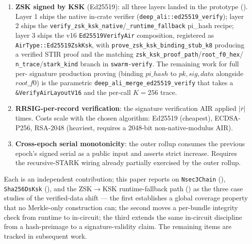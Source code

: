 \documentclass[11pt,a4paper]{article}
\theoremstyle{definition}
\theoremstyle{plain}
\begin{document}
\begin{enumerate}[leftmargin=*]
  \item \textbf{ZSK signed by KSK} (Ed25519): all three layers
        landed in the prototype ().
        Layer 1 ships the native in-crate verifier
        (\texttt{deep\_ali::ed25519\_verify}); layer 2 ships the
        \texttt{verify\_zsk\_ksk\_native}/\texttt{\_runtime\_fallback}
        pi_hash recipe; layer 3 ships the v16
        \texttt{Ed25519VerifyAir} composition, registered as
        \texttt{AirType::Ed25519ZskKsk}, with
        \texttt{prove\_zsk\_ksk\_binding\_stub\_k8} producing a
        verified STIR proof and the matching
        \texttt{zsk\_ksk\_proof\_path}/\texttt{root\_f0\_hex}/
        \texttt{n\_trace}/\texttt{stark\_kind} branch in
        \texttt{swarm-verify}.  The remaining work for full per-
        signature production proving (binding $\mathit{pi\_hash}$ to
        $\mathit{pk}, \mathit{sig}, \mathit{data}$ alongside
        $\mathit{root\_f0}$) is the parametric
        \texttt{deep\_ali\_merge\_ed25519\_verify} that takes a
        \texttt{\&VerifyAirLayoutV16} and the per-call
        $K=256$ trace.
  \item \textbf{RRSIG-per-record verification}: the signature
        verification AIR applied $|\bar{r}|$ times.  Costs scale with
        the chosen algorithm: Ed25519 (cheapest), ECDSA-P256, RSA-2048
        (heaviest, requires a 2048-bit non-native-modulus AIR).
  \item \textbf{Cross-epoch serial monotonicity}: the outer rollup
        consumes the previous epoch's signed serial as a public input
        and asserts strict increase.  Requires the recursive-STARK
        wiring already partially exercised by the outer rollup.
\end{enumerate}

Each is an independent contribution; this paper reports on
\texttt{Nsec3Chain} (),
\texttt{Sha256DsKsk} (), and the
ZSK$\to$KSK runtime-fallback path () as the
three case studies of the verified-data shift — the first
establishes a global coverage property that no Merkle-only
construction can; the second moves a per-bundle integrity check
from runtime to in-circuit; the third extends the same in-circuit
discipline from a hash-preimage to a signature-validity claim.
The remaining items are tracked in subsequent work.

\end{document}
